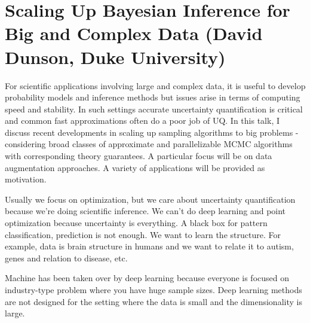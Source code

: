\section{Scaling Up Bayesian Inference for Big and Complex Data (David Dunson, Duke University)}

For scientific applications involving large and complex data, it is useful to develop probability models and inference methods but issues arise in terms of computing speed and stability. In such settings accurate uncertainty quantification is critical and common fast approximations often do a poor job of UQ. In this talk, I discuss recent developments in scaling up sampling algorithms to big problems - considering broad classes of approximate and parallelizable MCMC algorithms with corresponding theory guarantees. A particular focus will be on data augmentation approaches. A variety of applications will be provided as motivation.

Usually we focus on optimization, but we care about uncertainty quantification because we're doing scientific inference. We can't do  deep learning and point optimization because uncertainty is everything. A black box for pattern classification, prediction is not enough. We want to learn the structure. For example, data is brain structure in humans and we want to relate it to autism, genes and relation to disease, etc.

Machine has been taken over by deep learning because everyone is focused on industry-type problem where you have huge sample sizes. Deep learning methods  are not  designed for the setting where the data is small and the dimensionality is large. %


